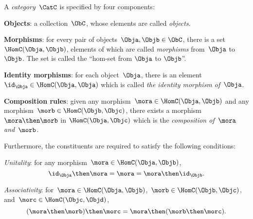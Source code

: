 \begin{ctdefinition}[Category] \label{def:categorymain}
A \emph{category}~$\CatC$ is specified by four components:
\begin{compactenum}
\item \textbf{Objects}: a collection\footnotemark~$\ObC$, whose elements are called \emph{objects}.
\item \textbf{Morphisms}: for every pair of objects~$\Obja,\Objb\in \ObC$, there is a set~$\HomC(\Obja,\Objb)$, elements of which are called
\emph{morphisms} from~$\Obja$ to~$\Objb$. The set is called the ``hom-set from $\Obja$ to $\Objb$''.
\item \textbf{Identity morphisms}: for each object~$\Obja$, there is
an element~$\id_{\Obja} \in \HomC(\Obja,\Obja) $ which is called \emph{the identity
morphism of~$\Obja$}.
\item \textbf{Composition rules}: given any morphism~$\mora \in  \HomC(\Obja,\Objb)$ and any morphism~$\morb \in \HomC(\Objb, \Objc)$, there exists a morphism~$\mora \then \morb$ in $\HomC(\Obja,\Objc)$ which is the \emph{composition of~$\mora$ and~$\morb$}.
\end{compactenum}

Furthermore, the constituents are required to satisfy the following conditions:
\begin{compactenum}
    \item \emph{Unitality}: for any morphism~$\mora\in\HomC(\Obja,\Objb)$,
    \begin{equation}
        \id_\Obja \then \mora= \mora = \mora \then \id_\Objb.
    \end{equation}
    \item \emph{Associativity}: for~$\mora\in \HomC(\Obja,\Objb)$,~$\morb\in \HomC(\Objb,\Objc)$, and~$\morc\in \HomC(\Objc,\Objd)$,
    \begin{equation}
        (\mora\then \morb)\then \morc= \mora \then (\morb \then \morc).
    \end{equation}
\end{compactenum}
\end{ctdefinition}

